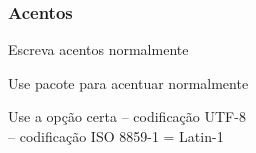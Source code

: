 \begin{frame}
\frametitle{Acentos}

    \begin{block}{Escreva acentos normalmente}\medskip

      Use pacote  para acentuar normalmente\medskip

      \centering \texttt{\purple{\string\usepackage}\red{[utf8]}}\medskip\par
    \end{block}

    \begin{alertblock}{Use a opção certa}
      \texttt{} -- codificação UTF-8\\
      \texttt{} -- codificação ISO 8859-1 = Latin-1      
    \end{alertblock}




\end{frame}


